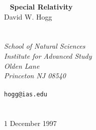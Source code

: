 \begin{titlepage}
~
\vfill
\center
{\Huge\bf Special Relativity} \\
\vspace{200pt}
{\Large David W. Hogg} \\
~\\
~\\
{\sl School of Natural Sciences} \\
{\sl Institute for Advanced Study} \\
{\sl Olden Lane} \\
{\sl Princeton NJ 08540} \\
~\\
{\tt hogg@ias.edu} \\
~\\
~\\
{1 December 1997}
\vfill
~
\end{titlepage}

\begin{titlepage}
~
\vfill
~
\end{titlepage}
